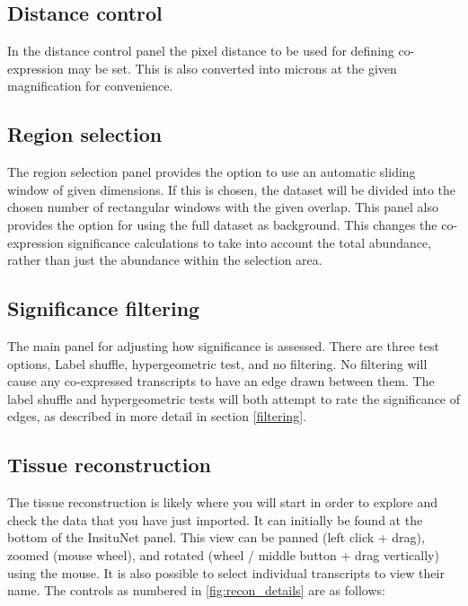 \documentclass[a4paper,12pt]{article}
\begin{document}
\subsection{Distance control}
In the distance control panel the pixel distance to be used for defining co-expression may be set. This is also converted into microns at the given magnification for convenience.
\subsection{Region selection}
The region selection panel provides the option to use an automatic sliding window of given dimensions. If this is chosen, the dataset will be divided into the chosen number of rectangular windows with the given overlap. This panel also provides the option for using the full dataset as background. This changes the co-expression significance calculations to take into account the total abundance, rather than just the abundance within the selection area.
\subsection{Significance filtering}
The main panel for adjusting how significance is assessed. There are three test options, Label shuffle, hypergeometric test, and no filtering. No filtering will cause any co-expressed transcripts to have an edge drawn between them. The label shuffle and hypergeometric tests will both attempt to rate the significance of edges, as described in more detail in section \ref{filtering}.


\subsection{Tissue reconstruction}
The tissue reconstruction is likely where you will start in order to explore and check the data that you have just imported. It can initially be found at the bottom of the InsituNet panel. This view can be panned (left click + drag), zoomed (mouse wheel), and rotated (wheel / middle button + drag vertically) using the mouse. It is also possible to select individual transcripts to view their name. The controls as numbered in \ref{fig:recon_details} are as follows:
\end{document}
